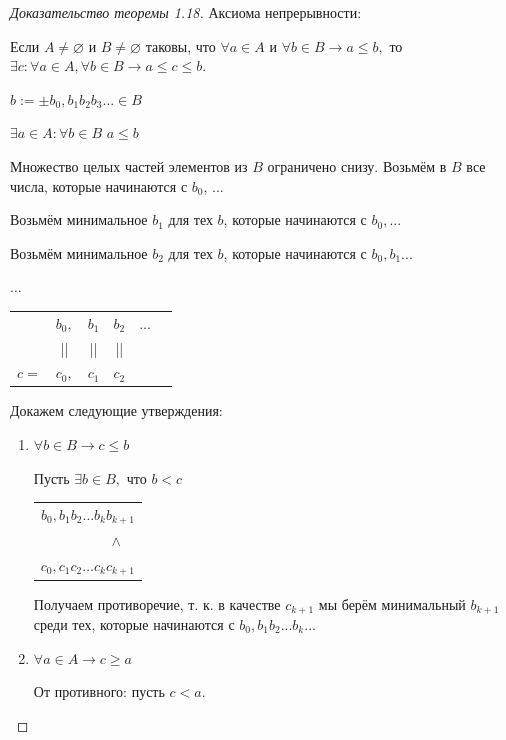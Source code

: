 	\begin{proof}[Доказательство теоремы 1.18]
		Аксиома непрерывности:
		
		Если $A \neq \varnothing$ и $B \neq \varnothing$ таковы, что $\forall a \in A$ и $\forall b \in B \rightarrow a \leqslant b,$ то $\exists c: \forall a \in A, \forall b \in B \rightarrow a \leqslant c \leqslant b.$
		
		$b := \pm b_0, b_1 b_2 b_3 ... \in B$
		
		$\exists a \in A: \forall b \in B$ $a \leqslant b$
		
		Множество целых частей элементов из $B$ ограничено снизу. Возьмём в $B$ все числа, которые начинаются с $b_0$, ...
		
		Возьмём минимальное $b_1$ для тех $b$, которые начинаются с $b_0, ...$
		
		Возьмём минимальное $b_2$ для тех $b$, которые начинаются с $b_0, b_1 ...$
		
		$\dots$
		
		\begin{tabular}{cccccc}
			& $b_0,$ & $b_1$ & $b_2$ & ... \\
			& || & || & || &  \\
			$c =$ & $c_0,$ & $c_1$ & $c_2$ &  \\
		\end{tabular}
		
		Докажем следующие утверждения:
		\begin{enumerate}
			\item $\forall b \in B \rightarrow c \leqslant b$
			
			Пусть $\exists b \in B,$ что $b < c$
			
			\begin{center}
				\begin{tabular}{r}
					$b_0, b_1 b_2 \dots b_k b_{k + 1}$ \\
					$\wedge$ $\text{ }$ \\
					$c_0, c_1 c_2 \dots c_k c_{k + 1}$ \\
				\end{tabular}
			\end{center}
			
			Получаем противоречие, т. к. в качестве $c_{k + 1}$ мы берём минимальный $b_{k + 1}$ среди тех, которые начинаются с $b_0, b_1 b_2 ... b_k ...$
			
			\item $\forall a \in A \rightarrow c \geqslant a$
			
			От противного: пусть $c < a$.
			

\end{enumerate}
\end{proof}
